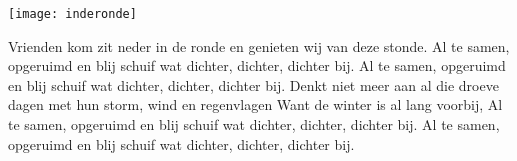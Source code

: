\begin{intersong}
    \texttt{[image: inderonde]}
\end{intersong}
\beginverse*
Vrienden kom zit neder in de ronde
en genieten wij van deze stonde.
Al te samen, opgeruimd en blij
schuif wat dichter, dichter, dichter bij.
Al te samen, opgeruimd en blij
schuif wat dichter, dichter, dichter bij.
\endverse
\beginverse*
Denkt niet meer aan al die droeve dagen
met hun storm, wind en regenvlagen
Want de winter is al lang voorbij,
Al te samen, opgeruimd en blij
schuif wat dichter, dichter, dichter bij.
Al te samen, opgeruimd en blij
schuif wat dichter, dichter, dichter bij.
\endverse
\endsong